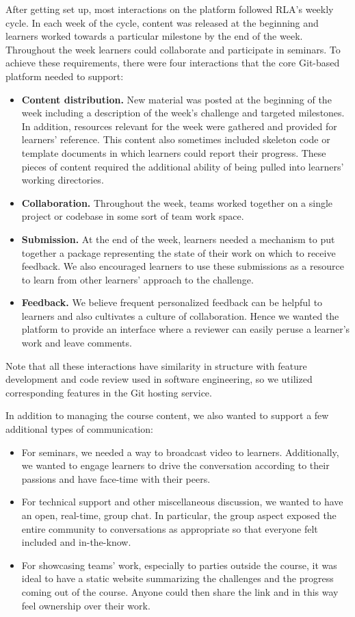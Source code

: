\documentclass[12pt,twoside]{mitthesis}
\begin{document}
After getting set up, most interactions on the platform followed RLA's weekly cycle. In each week of the cycle, content was released at the beginning and learners worked towards a particular milestone by the end of the week. Throughout the week learners could collaborate and participate in seminars. To achieve these requirements, there were four interactions that the core Git-based platform needed to support:
\begin{itemize}
\item \textbf{Content distribution.} New material was posted at the beginning of the week including a description of the week's challenge and targeted milestones. In addition, resources relevant for the week were gathered and provided for learners' reference. This content also sometimes included skeleton code or template documents in which learners could report their progress. These pieces of content required the additional ability of being pulled into learners' working directories.
\item \textbf{Collaboration.} Throughout the week, teams worked together on a single project or codebase in some sort of team work space. 
\item \textbf{Submission.} At the end of the week, learners needed a mechanism to put together a package representing the state of their work on which to receive feedback. We also encouraged learners to use these submissions as a resource to learn from other learners' approach to the challenge.
\item \textbf{Feedback.} We believe frequent personalized feedback can be helpful to learners and also cultivates a culture of collaboration. Hence we wanted the platform to provide an interface where a reviewer can easily peruse a learner's work and leave comments. 
\end{itemize}
Note that all these interactions have similarity in structure with feature development and code review used in software engineering, so we utilized corresponding features in the Git hosting service.

In addition to managing the course content, we also wanted to support a few additional types of communication:
\begin{itemize}
\item For seminars, we needed a way to broadcast video to learners. Additionally, we wanted to engage learners to drive the conversation according to their passions and have face-time with their peers.
\item For technical support and other miscellaneous discussion, we wanted to have an open, real-time, group chat. In particular, the group aspect exposed the entire community to conversations as appropriate so that everyone felt included and in-the-know.
\item For showcasing teams' work, especially to parties outside the course, it was ideal to have a static website summarizing the challenges and the progress coming out of the course. Anyone could then share the link and in this way feel ownership over their work.
\end{itemize}
\end{document}
